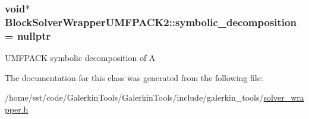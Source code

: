 \subsubsection[{\texorpdfstring{symbolic\+\_\+decomposition}{symbolic_decomposition}}]{\setlength{\rightskip}{0pt plus 5cm}void$\ast$ Block\+Solver\+Wrapper\+U\+M\+F\+P\+A\+C\+K2\+::symbolic\+\_\+decomposition = nullptr\hspace{0.3cm}{\ttfamily [private]}}\hypertarget{class_block_solver_wrapper_u_m_f_p_a_c_k2_a399387c1717404d92ed721fc31767f55}{}\label{class_block_solver_wrapper_u_m_f_p_a_c_k2_a399387c1717404d92ed721fc31767f55}
U\+M\+F\+P\+A\+CK symbolic decomposition of A 

The documentation for this class was generated from the following file\+:\begin{DoxyCompactItemize}
\item 
/home/sst/code/\+Galerkin\+Tools/\+Galerkin\+Tools/include/galerkin\+\_\+tools/\hyperlink{solver__wrapper_8h}{solver\+\_\+wrapper.\+h}\end{DoxyCompactItemize}
